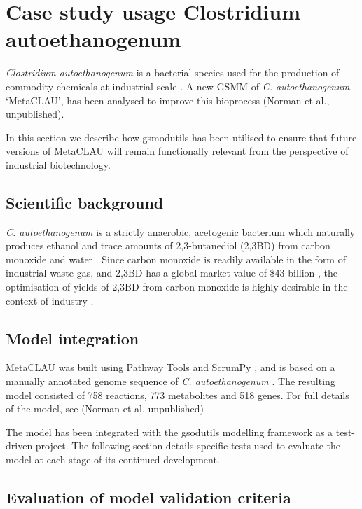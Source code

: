 \documentclass[a4paper,10pt]{article}
\begin{document}
\section{Case study usage Clostridium autoethanogenum}
\textit{Clostridium autoethanogenum} is a bacterial species used for the production of commodity chemicals at industrial scale \cite{abrini1994clostridium,norman2018progress,LT}. A new GSMM of \textit{C. autoethanogenum}, `MetaCLAU', has been analysed to improve this bioprocess (Norman et al., unpublished).

In this section we describe how gsmodutils has been utilised to ensure that future versions of MetaCLAU will remain functionally relevant from the perspective of industrial biotechnology.

\subsection{Scientific background}

\textit{C. autoethanogenum} is a strictly anaerobic, acetogenic bacterium which naturally produces ethanol and trace amounts of 2,3-butanediol (2,3BD) from carbon monoxide and water \cite{abrini1994clostridium,schuchmann2014autotrophy,norman2018progress}. Since carbon monoxide is readily available in the form of industrial waste gas, and 2,3BD has a global market value of \$43 billion \cite{kopke201123butanediol}, the optimisation of yields of 2,3BD from carbon monoxide is highly desirable in the context of industry \cite{norman2018progress}.   

\subsection{Model integration}

MetaCLAU was built using Pathway Tools \cite{karp2002pathway} and ScrumPy \cite{poolman2006scrumpy}, and is based on a manually annotated genome sequence of \textit{C. autoethanogenum} \cite{humphreys2015whole}. The resulting model consisted of 758 reactions, 773 metabolites and 518 genes. For full details of the model, see (Norman et al. unpublished)

The model has been integrated with the gsodutils modelling framework as a test-driven project. The following section details specific tests used to evaluate the model at each stage of its continued development.

\subsection{Evaluation of model validation criteria}
\end{document}
